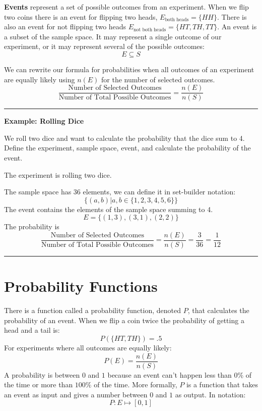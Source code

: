 \documentclass[
]{book}
\begin{document}
\textbf{Events} represent a set of possible outcomes from an experiment. When we flip two coins there is an event for flipping two heads, \(E_\text{both heads}=\{HH\}\). There is also an event for not flipping two heads \(E_\text{not both heads}=\{HT,TH,TT\}\). An event is a subset of the sample space. It may represent a single outcome of our experiment, or it may represent several of the possible outcomes:
\[E \subseteq S\]

We can rewrite our formula for probabilities when all outcomes of an experiment are equally likely using \(n(E)\) for the number of selected outcomes.
\[\frac{\text{Number of Selected Outcomes}}{\text{Number of Total Possible Outcomes}} = \frac{n(E)}{n(S)}\]

\begin{center}\rule{0.5\linewidth}{0.5pt}\end{center}

\textbf{Example: Rolling Dice}

We roll two dice and want to calculate the probability that the dice sum to 4. Define the experiment, sample space, event, and calculate the probability of the event.

The experiment is rolling two dice.

The sample space has 36 elements, we can define it in set-builder notation:
\[\{(a,b)|a,b \in \{1,2,3,4,5,6\}\}\]
The event contains the elements of the sample space summing to 4.
\[E = \{(1,3),(3,1),(2,2)\}\]
The probability is
\[\frac{\text{Number of Selected Outcomes}}{\text{Number of Total Possible Outcomes}} = \frac{n(E)}{n(S)} = \frac{3}{36}=\frac{1}{12}\]

\begin{center}\rule{0.5\linewidth}{0.5pt}\end{center}

\hypertarget{probability-functions}{%
\section{Probability Functions}\label{probability-functions}}

There is a function called a probability function, denoted \(P\), that calculates the probability of an event. When we flip a coin twice the probability of getting a head and a tail is:
\[P(\{HT, TH\})=.5\]
For experiments where all outcomes are equally likely:
\[P(E) = \frac{n(E)}{n(S)}\]
A probability is between \(0\) and \(1\) because an event can't happen less than \(0\%\) of the time or more than \(100\%\) of the time. More formally, \(P\) is a function that takes an event as input and gives a number between \(0\) and \(1\) as output. In notation:
\[P:E \mapsto [0,1]\]
\end{document}
